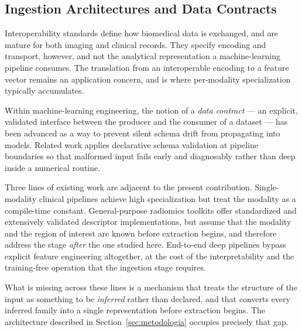 \subsection{Ingestion Architectures and Data Contracts}
\label{subsec:ingestao}

Interoperability standards define how biomedical data is exchanged, and are mature for both imaging
and clinical records. They specify encoding and
transport, however, and not the analytical representation a machine-learning pipeline consumes. The
translation from an interoperable encoding to a feature vector remains an application concern, and
is where per-modality specialization typically accumulates.

Within machine-learning engineering, the notion of a \emph{data contract} --- an explicit, validated
interface between the producer and the consumer of a dataset --- has been advanced as a way to
prevent silent schema drift from propagating into models. Related work applies declarative schema validation at pipeline boundaries
so that malformed input fails early and diagnosably rather than deep inside a numerical
routine.

Three lines of existing work are adjacent to the present contribution. Single-modality clinical
pipelines achieve high specialization but treat the modality as a compile-time constant.
General-purpose radiomics toolkits offer standardized and extensively validated descriptor
implementations, but assume that the modality and the region of interest are known before extraction
begins, and therefore address the stage \emph{after} the one studied
here. End-to-end deep pipelines bypass explicit feature engineering
altogether, at the cost of the interpretability and the training-free operation that the ingestion
stage requires.

What is missing across these lines is a mechanism that treats the structure of the input as
something to be \emph{inferred} rather than declared, and that converts every inferred family into a
single representation before extraction begins. The architecture described in
Section~\ref{sec:metodologia} occupies precisely that gap.
